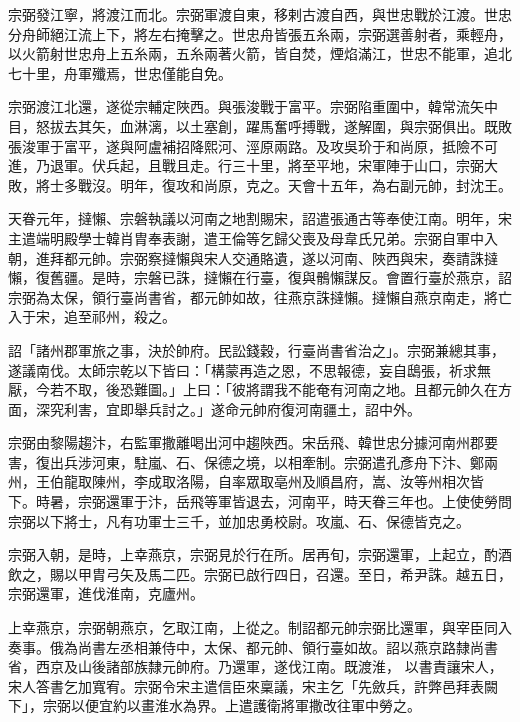 \begin{pinyinscope}
 宗弼發江寧，將渡江而北。宗弼軍渡自東，移剌古渡自西，與世忠戰於江渡。世忠分舟師絕江流上下，將左右掩擊之。世忠舟皆張五糸兩，宗弼選善射者，乘輕舟，以火箭射世忠舟上五糸兩，五糸兩著火箭，皆自焚，煙焰滿江，世忠不能軍，追北七十里，舟軍殲焉，世忠僅能自免。



 宗弼渡江北還，遂從宗輔定陜西。與張浚戰于富平。宗弼陷重圍中，韓常流矢中目，怒拔去其矢，血淋漓，以土塞創，躍馬奮呼搏戰，遂解圍，與宗弼俱出。既敗張浚軍于富平，遂與阿盧補招降熙河、涇原兩路。及攻吳玠于和尚原，抵險不可
 進，乃退軍。伏兵起，且戰且走。行三十里，將至平地，宋軍陣于山口，宗弼大敗，將士多戰沒。明年，復攻和尚原，克之。天會十五年，為右副元帥，封沈王。



 天眷元年，撻懶、宗磐執議以河南之地割賜宋，詔遣張通古等奉使江南。明年，宋主遣端明殿學士韓肖胄奉表謝，遣王倫等乞歸父喪及母韋氏兄弟。宗弼自軍中入朝，進拜都元帥。宗弼察撻懶與宋人交通賂遺，遂以河南、陜西與宋，奏請誅撻懶，復舊疆。是時，宗磐已誅，撻懶在行臺，復與鶻懶謀反。會置行臺於燕京，詔宗弼為太保，領行臺尚書省，都元帥如故，往燕京誅撻懶。撻懶自燕京南走，將亡
 入于宋，追至祁州，殺之。



 詔「諸州郡軍旅之事，決於帥府。民訟錢穀，行臺尚書省治之」。宗弼兼總其事，遂議南伐。太師宗乾以下皆曰：「構蒙再造之恩，不思報德，妄自鴟張，祈求無厭，今若不取，後恐難圖。」上曰：「彼將謂我不能奄有河南之地。且都元帥久在方面，深究利害，宜即舉兵討之。」遂命元帥府復河南疆土，詔中外。



 宗弼由黎陽趨汴，右監軍撒離喝出河中趨陜西。宋岳飛、韓世忠分據河南州郡要害，復出兵涉河東，駐嵐、石、保德之境，以相牽制。宗弼遣孔彥舟下汴、鄭兩州，王伯龍取陳州，李成取洛陽，自率眾取亳州及順昌府，嵩、汝等州相次皆
 下。時暑，宗弼還軍于汴，岳飛等軍皆退去，河南平，時天眷三年也。上使使勞問宗弼以下將士，凡有功軍士三千，並加忠勇校尉。攻嵐、石、保德皆克之。



 宗弼入朝，是時，上幸燕京，宗弼見於行在所。居再旬，宗弼還軍，上起立，酌酒飲之，賜以甲胄弓矢及馬二匹。宗弼已啟行四日，召還。至日，希尹誅。越五日，宗弼還軍，進伐淮南，克廬州。



 上幸燕京，宗弼朝燕京，乞取江南，上從之。制詔都元帥宗弼比還軍，與宰臣同入奏事。俄為尚書左丞相兼侍中，太保、都元帥、領行臺如故。詔以燕京路隸尚書省，西京及山後諸部族隸元帥府。乃還軍，遂伐江南。既渡淮，
 以書責讓宋人，宋人答書乞加寬宥。宗弼令宋主遣信臣來稟議，宋主乞「先斂兵，許弊邑拜表闕下」，宗弼以便宜約以畫淮水為界。上遣護衛將軍撒改往軍中勞之。




\end{pinyinscope}
